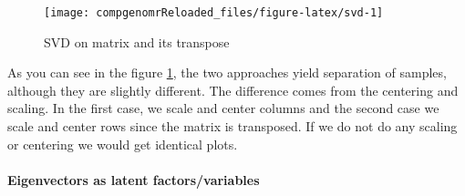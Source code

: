 \documentclass[12pt,]{krantz}
\newenvironment{Shaded}{\begin{snugshade}}{\end{snugshade}}
\newcommand{\CommentTok}[1]{\textcolor[rgb]{0.56,0.35,0.01}{\textit{#1}}}
\newcommand{\DataTypeTok}[1]{\textcolor[rgb]{0.13,0.29,0.53}{#1}}
\newcommand{\DecValTok}[1]{\textcolor[rgb]{0.00,0.00,0.81}{#1}}
\newcommand{\KeywordTok}[1]{\textcolor[rgb]{0.13,0.29,0.53}{\textbf{#1}}}
\newcommand{\NormalTok}[1]{#1}
\newcommand{\OperatorTok}[1]{\textcolor[rgb]{0.81,0.36,0.00}{\textbf{#1}}}
\newcommand{\OtherTok}[1]{\textcolor[rgb]{0.56,0.35,0.01}{#1}}
\newcommand{\StringTok}[1]{\textcolor[rgb]{0.31,0.60,0.02}{#1}}
\let\oldparagraph\paragraph
\renewcommand{\paragraph}[1]{\oldparagraph{#1}\mbox{}}
\begin{document}
\begin{Shaded}
\end{Shaded}

\begin{figure}

{\centering \texttt{[image: compgenomrReloaded\_files/figure-latex/svd-1]} 

}

\caption{SVD on matrix and its transpose}\label{fig:svd}
\end{figure}

As you can see in the figure \ref{fig:svd}, the two approaches yield separation of samples, although they are slightly different. The difference comes from the centering and scaling. In the first case, we scale and center columns and the second case we scale and center rows since the matrix is transposed. If we do not do any scaling or centering we would get identical plots.

\hypertarget{eigenvectors-as-latent-factorsvariables}{%
\paragraph{Eigenvectors as latent factors/variables}\label{eigenvectors-as-latent-factorsvariables}}
\end{document}
